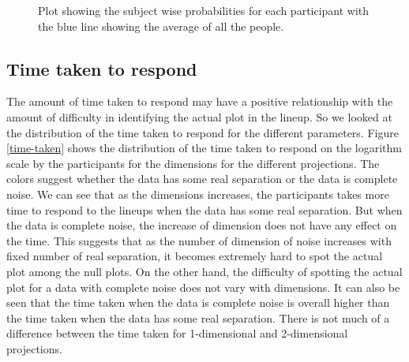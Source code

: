 \documentclass[12]{article}
\begin{document}
\begin{figure}[hbtp]
   \centering
      \caption{Plot showing the subject wise probabilities for each participant with the blue line showing the average of all the people.}
       \label{subject-glm}
\end{figure}

\subsection{Time taken to respond}

The amount of time taken to respond may have a positive relationship with the amount of difficulty in identifying the actual plot in the lineup. So we looked at the distribution of the time taken to respond for the different parameters. Figure \ref{time-taken} shows the distribution of the time taken to respond on the logarithm scale by the participants for the dimensions for the different projections. The colors suggest whether the data has some real separation or the data is complete noise. We can see that as the dimensions increases, the participants  takes more time to respond to the lineups when the data has some real separation. But when the data is complete noise, the increase of dimension does not have any effect on the time. This suggests that as the number of dimension of noise increases with fixed number of real separation, it becomes extremely hard to spot the actual plot among the null plots. On the other hand, the difficulty of spotting the actual plot for a data with complete noise does not vary with dimensions. It can also be seen that the time taken when the data is complete noise is overall higher than the time taken when the data has some real separation. There is not much of a difference between the time taken for 1-dimensional and 2-dimensional projections.
\end{document}
